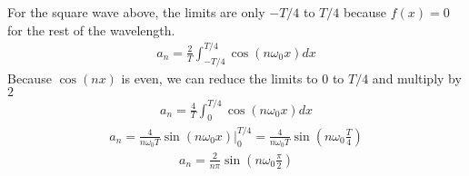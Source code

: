 \documentclass[letterpaper,10pt,english]{jupyterBook}
\begin{document}
\sphinxAtStartPar
For the square wave above, the limits are only \(-T/4\) to \(T/4\) because \(f(x)=0\) for the rest of the wavelength.
\begin{equation*}
\begin{split}
a_n = \frac{2}{T} \int_{-T/4}^{T/4}\cos(n \omega_0 x)dx
\end{split}
\end{equation*}
\sphinxAtStartPar
Because \(\cos(nx)\) is even, we can reduce the limits to \(0\) to \(T/4\) and multiply by \(2\)
\begin{equation*}
\begin{split}
a_n = \frac{4}{T} \int_{0}^{T/4}\cos(n \omega_0 x)dx
\end{split}
\end{equation*}\begin{equation*}
\begin{split}
a_n = \frac{4}{n \omega_0 T} \sin(n \omega_0 x)\bigg|^{T/4}_0  =\frac{4}{n \omega_0 T}\sin \left( n\omega_0 \frac{T}{4} \right)
\end{split}
\end{equation*}\begin{equation*}
\begin{split}
a_n =\frac{2}{n\pi}\sin \left(n \omega_0 \frac{\pi}{2} \right)
\end{split}
\end{equation*}
\end{document}
